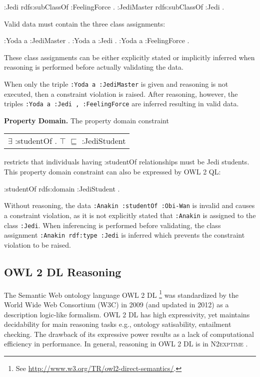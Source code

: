 \documentclass{llncs}
\newcommand{\ms}[1]{\texttt{#1}}
\newcommand{\tb}[1]{\todo[size=\small, color=green!40]{\textbf{Thomas:} #1}}
\newenvironment{DL}{
  \scriptsize
  \sffamily
  \vspace{0.3cm}
  \begin{tabular}{l}

}{
  \end{tabular}
  \linebreak
}
\begin{document}
\begin{ex}
:Jedi rdfs:subClassOf :FeelingForce . 
:JediMaster rdfs:subClassOf :Jedi . 
\end{ex}

Valid data must contain the three class assignments:

\begin{ex}
:Yoda a :JediMaster . 
:Yoda a :Jedi . 
:Yoda a :FeelingForce .
\end{ex}

These class assignments can be either explicitly stated or implicitly inferred when reasoning is performed before actually validating the data.

When only the triple \ms{:Yoda a :JediMaster} is given and reasoning is not executed, then a constraint violation is raised.
After reasoning, however, the triples \ms{:Yoda a :Jedi , :FeelingForce} are inferred resulting in valid data. 

\textbf{Property Domain.}
The property domain constraint

\begin{DL}
$\exists$ :studentOf . $\top$ $\sqsubseteq$ :JediStudent \\
\end{DL}

restricts that individuals having :studentOf relationships must be Jedi students.
This property domain constraint can also be expressed by OWL 2 QL:

\begin{ex}
:studentOf rdfs:domain :JediStudent .
\end{ex}

Without reasoning, the data \ms{:Anakin :studentOf :Obi-Wan} is invalid and causes a constraint violation, as it is not explicitly stated that \ms{:Anakin} is assigned to the class \ms{:Jedi}. 
When inferencing is performed before validating, the class assignment \ms{:Anakin rdf:type :Jedi} is inferred which prevents the constraint violation to be raised.

\subsection{OWL 2 DL Reasoning}


The Semantic Web ontology language OWL 2 DL \footnote{See \url{http://www.w3.org/TR/owl2-direct-semantics/}.} was standardized by
the World Wide Web Consortium (W3C) in 2009 (and updated in 2012) as a
description logic-like formalism.  OWL 2 DL has high expressivity, yet maintains  decidability for main reasoning tasks e.g., ontology satisability, 
entailment checking. The drawback of its expressive power results as a lack of computational efficiency in performance. In general, reasoning in OWL 2 DL is in \textsc{N2exptime} \cite{owl2profiles2008}. 
\end{document}
